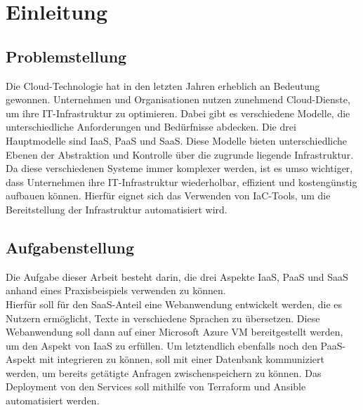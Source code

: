 


\chapter{Einleitung}\label{c:1}

\section{Problemstellung}\label{c:1_s:problem}
Die Cloud-Technologie hat in den letzten Jahren erheblich an Bedeutung gewonnen. Unternehmen und Organisationen nutzen zunehmend Cloud-Dienste, um ihre \ac{IT}-Infrastruktur zu optimieren. Dabei gibt es verschiedene Modelle, die unterschiedliche Anforderungen und Bedürfnisse abdecken. Die drei Hauptmodelle sind \ac{IaaS}, \ac{PaaS} und \ac{SaaS}. Diese Modelle bieten unterschiedliche Ebenen der Abstraktion und Kontrolle über die zugrunde liegende Infrastruktur.\\
Da diese verschiedenen Systeme immer komplexer werden, ist es umso wichtiger, dass Unternehmen ihre IT-Infrastruktur wiederholbar, effizient und kostengünstig aufbauen können. Hierfür eignet sich das Verwenden von \ac{IaC}-Tools, um die Bereitstellung der Infrastruktur automatisiert wird.

\section{Aufgabenstellung}\label{c:1_s:task}
Die Aufgabe dieser Arbeit besteht darin, die drei Aspekte \ac{IaaS}, \ac{PaaS} und \ac{SaaS} anhand eines Praxisbeispiels verwenden zu können.\\
Hierfür soll für den \ac{SaaS}-Anteil eine Webanwendung entwickelt werden, die es Nutzern ermöglicht, Texte in verschiedene Sprachen zu übersetzen. Diese Webanwendung soll dann auf einer Microsoft Azure VM bereitgestellt werden, um den Aspekt von \ac{IaaS} zu erfüllen. Um letztendlich ebenfalls noch den \ac{PaaS}-Aspekt mit integrieren zu können, soll mit einer Datenbank kommuniziert werden, um bereits getätigte Anfragen zwischenspeichern zu können. Das Deployment von den Services soll mithilfe von Terraform und Ansible automatisiert werden. 

